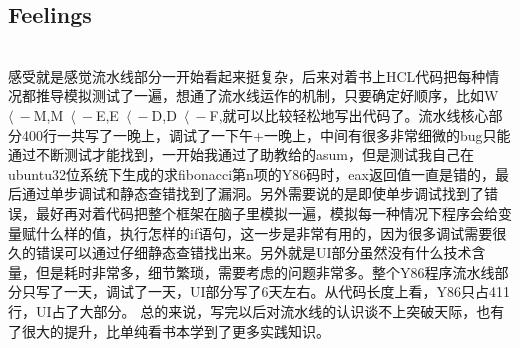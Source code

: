 \documentclass{article}
\begin{document}
\begin{spacing}{1.5}
\section{Feelings}
\noindent
{}
\setlength{\hangindent}{3.3em}\\
感受就是感觉流水线部分一开始看起来挺复杂，后来对着书上HCL代码把每种情况都推导模拟测试了一遍，想通了流水线运作的机制，只要确定好顺序，比如W\ $\langle\  -$M,M\ $\langle\  -$E,E\ $\langle\  -$D,D\ $\langle\  -$F,就可以比较轻松地写出代码了。流水线核心部分400行一共写了一晚上，调试了一下午+一晚上，中间有很多非常细微的bug只能通过不断测试才能找到，一开始我通过了助教给的asum，但是测试我自己在ubuntu32位系统下生成的求fibonacci第n项的Y86码时，eax返回值一直是错的，最后通过单步调试和静态查错找到了漏洞。另外需要说的是即使单步调试找到了错误，最好再对着代码把整个框架在脑子里模拟一遍，模拟每一种情况下程序会给变量赋什么样的值，执行怎样的if语句，这一步是非常有用的，因为很多调试需要很久的错误可以通过仔细静态查错找出来。另外就是UI部分虽然没有什么技术含量，但是耗时非常多，细节繁琐，需要考虑的问题非常多。整个Y86程序流水线部分只写了一天，调试了一天，UI部分写了6天左右。从代码长度上看，Y86只占411行，UI占了大部分。
总的来说，写完以后对流水线的认识谈不上突破天际，也有了很大的提升，比单纯看书本学到了更多实践知识。
\end{spacing}
\end{document}
